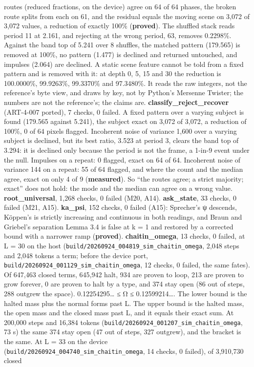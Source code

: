 \begin{description}
routes (reduced fractions, on the device) agree on 64 of 64 phases, the broken route splits from each on 61, and the residual equals the moving scene on 3,072 of 3,072 values, a reduction of exactly 100\% (\textbf{proved}). The shuffled stack reads period 11 at 2.161, and rejecting at the wrong period, 63, removes 0.2298\%. Against the band top of 5.241 over 8 shuffles, the matched pattern (179.565) is removed at 100\%, no pattern (1.477) is declined and returned untouched, and impulses (2.064) are declined. A static scene feature cannot be told from a fixed pattern and is removed with it: at depth 0, 5, 15 and 30 the reduction is 100.0000\%, 99.9263\%, 99.3370\% and 97.3480\%. It reads the raw integers, not the reference's byte view, and draws by key, not by Python's Mersenne Twister; the numbers are not the reference's; the claims are. \textbf{classify\_\allowbreak{}reject\_\allowbreak{}recover} (ART-4-007 ported), 7 checks, 0 failed. A fixed pattern over a varying subject is found (179.565 against 5.241), the subject exact on 3,072 of 3,072, a reduction of 100\%, 0 of 64 pixels flagged. Incoherent noise of variance 1,600 over a varying subject is declined, but its best ratio, 3.523 at period 3, clears the band top of 3.294: it is declined only because the period is not the frame, a 1-in-9 event under the null. Impulses on a repeat: 0 flagged, exact on 64 of 64. Incoherent noise of variance 144 on a repeat: 55 of 64 flagged, and where the count and the median agree, exact on only 4 of 9 (\textbf{measured}). So “the routes agree; a strict majority; exact” does not hold: the mode and the median can agree on a wrong value. \textbf{root\_\allowbreak{}universal}, 1,268 checks, 0 failed (M20, A14). \textbf{ask\_\allowbreak{}state}, 33 checks, 0 failed (M21, A15). \textbf{ka\_\allowbreak{}psi}, 152 checks, 0 failed (A15): Sprecher's ψ descends, Köppen's is strictly increasing and continuous in both readings, and Braun and Griebel's separation Lemma 3.4 is false at k = 1 and restored by a corrected bound with a narrower ramp (\textbf{proved}). \textbf{chaitin\_\allowbreak{}omega}, 13 checks, 0 failed, at L = 30 on the host (\texttt{build/\allowbreak{}20260924\_\allowbreak{}004819\_\allowbreak{}sim\_\allowbreak{}chaitin\_\allowbreak{}omega}, 2,048 steps and 2,048 tokens a term; before the device port, \texttt{build/\allowbreak{}20260924\_\allowbreak{}001129\_\allowbreak{}sim\_\allowbreak{}chaitin\_\allowbreak{}omega}, 12 checks, 0 failed, the same fates). Of 647,463 closed terms, 645,942 halt, 934 are proven to loop, 213 are proven to grow forever, 0 are proven to halt by a type, and 374 stay open (86 out of steps, 288 outgrew the space). 0.12254295… ≤ Ω ≤ 0.12599214…. The lower bound is the halted mass plus the normal forms past L. The upper bound is the halted mass, the open mass and the closed mass past L, and it equals their exact sum. At 200,000 steps and 16,384 tokens (\texttt{build/\allowbreak{}20260924\_\allowbreak{}001207\_\allowbreak{}sim\_\allowbreak{}chaitin\_\allowbreak{}omega}, 73 s) the same 374 stay open (47 out of steps, 327 outgrew), and the bracket is the same. At L = 33 on the device (\texttt{build/\allowbreak{}20260924\_\allowbreak{}004740\_\allowbreak{}sim\_\allowbreak{}chaitin\_\allowbreak{}omega}, 14 checks, 0 failed), of 3,910,730 closed 
\end{description}
